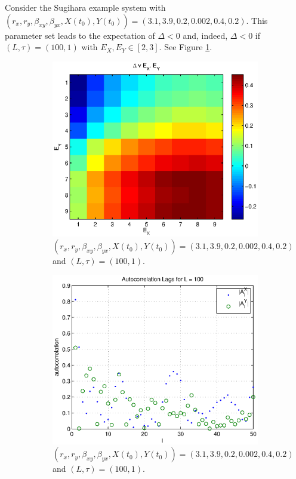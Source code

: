 \documentclass[a4paper,11pt]{article}
\begin{document}
Consider the Sugihara example system with $\left(r_x,r_y,\beta_{xy},\beta_{yx},X(t_0),Y(t_0)\right) = \left(3.1,3.9,0.2,0.002,0.4,0.2\right)$.  This parameter set leads to the expectation of $\Delta<0$ and, indeed, $\Delta<0$ if $(L,\tau)=(100,1)$ with $E_X,E_Y\in[2,3]$.  See Figure \ref{fig:SugEx2VaryE}.
\begin{figure}[h!t]
\centering
\begin{subfigure}[b]{0.4\textwidth}
\label{fig:SugEx2VaryE}
\includegraphics[scale=0.55]{SugEx2VaryE.eps}
\caption{$\left(r_x,r_y,\beta_{xy},\beta_{yx},X(t_0),Y(t_0)\right) = \left(3.1,3.9,0.2,0.002,0.4,0.2\right)$ and $\left(L,\tau\right) = \left(100,1\right)$.}
\end{subfigure}
\begin{subfigure}[b]{0.4\textwidth}
\label{fig:SugEx2VaryEauto}
\includegraphics[scale=0.55]{SugEx2VaryEauto.eps}
\caption{$\left(r_x,r_y,\beta_{xy},\beta_{yx},X(t_0),Y(t_0)\right) = \left(3.1,3.9,0.2,0.002,0.4,0.2\right)$ and $\left(L,\tau\right) = \left(100,1\right)$.}
\end{subfigure}
\caption{}
\end{figure}
\end{document}
